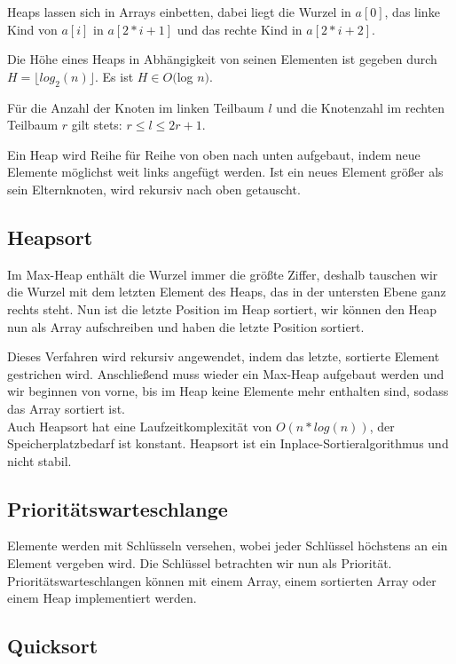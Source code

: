 \documentclass[12pt]{article}
\begin{document}
Heaps lassen sich in Arrays einbetten, dabei liegt die Wurzel in $a[0]$, das linke Kind von $a[i]$ in $a[2*i+1]$ und das rechte Kind in $a[2*i+2]$.

Die Höhe eines Heaps in Abhängigkeit von seinen Elementen ist gegeben durch $H = \lfloor{}log_2(n)\rfloor$. Es ist $H \in O($log $n)$.

Für die Anzahl der Knoten im linken Teilbaum $l$ und die Knotenzahl im rechten Teilbaum $r$ gilt stets: $r \leq l \leq 2r + 1$.

Ein Heap wird Reihe für Reihe von oben nach unten aufgebaut, indem neue Elemente möglichst weit links angefügt werden. Ist ein neues Element größer als sein Elternknoten, wird rekursiv nach oben getauscht.

\subsection{Heapsort}

Im Max-Heap enthält die Wurzel immer die größte Ziffer, deshalb tauschen wir die Wurzel mit dem letzten Element des Heaps, das in der untersten Ebene ganz rechts steht. Nun ist die letzte Position im Heap sortiert, wir können den Heap nun als Array aufschreiben und haben die letzte Position sortiert.

Dieses Verfahren wird rekursiv angewendet, indem das letzte, sortierte Element gestrichen wird. Anschließend muss wieder ein Max-Heap aufgebaut werden und wir beginnen von vorne, bis im Heap keine Elemente mehr enthalten sind, sodass das Array sortiert ist.\\

Auch Heapsort hat eine Laufzeitkomplexität von $O(n*log(n))$, der Speicherplatzbedarf ist konstant. Heapsort ist ein Inplace-Sortieralgorithmus und nicht stabil.

\subsection{Prioritätswarteschlange}

Elemente werden mit Schlüsseln versehen, wobei jeder Schlüssel höchstens an ein Element vergeben wird. Die Schlüssel betrachten wir nun als Priorität. Prioritätswarteschlangen können mit einem Array, einem sortierten Array oder einem Heap implementiert werden.

\subsection{Quicksort}
\end{document}
